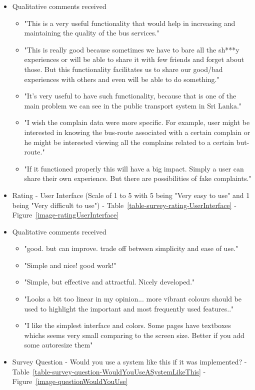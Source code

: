 \begin {itemize}
\item Qualitative comments received
\begin {itemize}
\item "This is a very useful functionality that would help in increasing and maintaining the quality of the bus services."
\item "This is really good because sometimes we have to bare all the sh***y experiences or will be able to share it with few friends and forget about those. But this functionality facilitates us to share our good/bad experiences with others and even will be able to do something."
\item "It's very useful to have such functionality, because that is one of  the main problem we can see in the public transport system in Sri Lanka."
\item "I wish the complain data were more specific. For example, user might be interested in knowing the bus-route associated with a certain complain or he might be interested viewing all the complains related to a certain but-route."
\item "If it functioned properly this will have a big impact. Simply a user can share their own experience. But there are possibilities of fake complaints."
\end {itemize}

\item Rating - User Interface (Scale of 1 to 5 with 5 being "Very easy to use" and 1 being "Very difficult to use") - Table~\ref{table-survey-rating-UserInterface} - Figure~\ref{image-ratingUserInterface}

\item Qualitative comments received
\begin {itemize}
\item "good. but can improve. trade off between simplicity and ease of use."
\item "Simple and nice! good work!"
\item "Simple, but effective and attractful. Nicely developed."
\item "Looks a bit too linear in my opinion... more vibrant colours should be used to highlight the important and most frequently used features.."
\item "I like the simplest interface and colors. Some pages have textboxes whichs seems very small comparing to the screen size. Better if you add some autoresize them"
\end {itemize}

\item Survey Question - Would you use a system like this if it was implemented? - Table~\ref{table-survey-question-WouldYouUseASystemLikeThis} - Figure~\ref{image-questionWouldYouUse}


\end{itemize}
